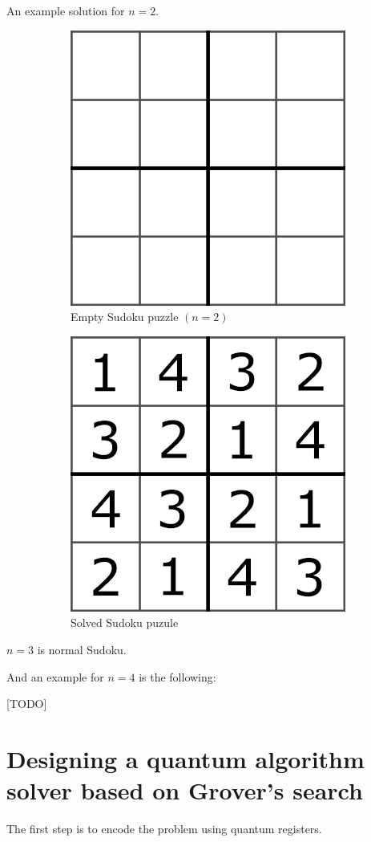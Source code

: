 An example solution for $n=2$.

\begin{figure}[H]
  \centering
  \begin{subfigure}{.5\linewidth}
    \centering
    \includegraphics[width=0.622\linewidth]{content/assets/03_grovers_algorithm/sudoku_2.png}
    \caption{Empty Sudoku puzzle $(n=2)$}
  \end{subfigure}
  \begin{subfigure}{.5\linewidth}
    \centering
    \includegraphics[width=0.622\linewidth]{content/assets/03_grovers_algorithm/sudoku_2_solved.png}
    \caption{Solved Sudoku puzule}
  \end{subfigure}
  \caption{}
\end{figure}




$n=3$ is normal Sudoku.

And an example for $n=4$ is the following:




[TODO]



\section{Designing a quantum algorithm solver based on Grover's search}

The first step is to encode the problem using quantum registers.

